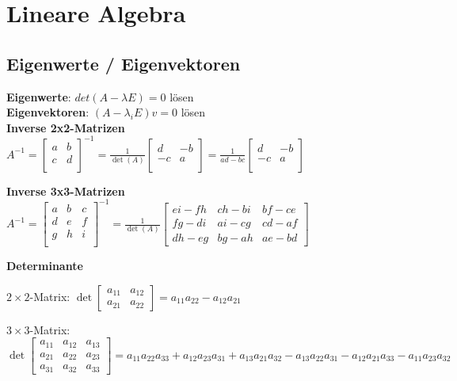 \section{Lineare Algebra}
\subsection{Eigenwerte / Eigenvektoren}
\textbf{Eigenwerte}: $det(A-\lambda E) = 0$ lösen\\

\textbf{Eigenvektoren}: $(A-\lambda_i E)v = 0$ lösen\\

\textbf{Inverse 2x2-Matrizen}\\
$A^{-1} = \begin{bmatrix}
a & b \\ c & d \\
\end{bmatrix}^{-1} =
\frac{1}{\det(A)} \begin{bmatrix}
d & -b \\ -c & a \\
\end{bmatrix}  =
\frac{1}{ad-bc} \begin{bmatrix}
d & -b \\ -c & a \\
\end{bmatrix}$

\textbf{Inverse 3x3-Matrizen}\\
$A^{-1} = \begin{bmatrix}
a & b & c\\ d & e & f \\ g & h & i \\
\end{bmatrix}^{-1} =
\frac{1}{\det(A)} \begin{bmatrix}
ei - fh & ch - bi & bf - ce \\
fg - di & ai - cg & cd - af \\
dh - eg & bg - ah & ae - bd
\end{bmatrix}$

\textbf{Determinante}

$2 \times 2$-Matrix:
$\det
 \begin{bmatrix}
 a_{11} & a_{12} \\
 a_{21} & a_{22}
 \end{bmatrix}
= a_{11} a_{22} - a_{12} a_{21}$

$3 \times 3$-Matrix:
$\det
 \begin{bmatrix}
 a_{11} & a_{12} & a_{13} \\
 a_{21} & a_{22} & a_{23} \\
 a_{31} & a_{32} & a_{33}
 \end{bmatrix} = a_{11} a_{22} a_{33} +a_{12} a_{23} a_{31} + a_{13} a_{21} a_{32} - a_{13} a_{22} a_{31} - a_{12} a_{21} a_{33} - a_{11} a_{23} a_{32}$

